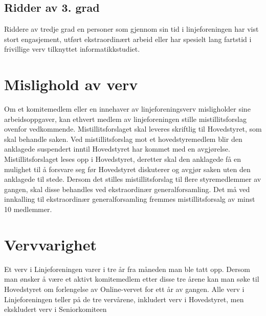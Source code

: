 \subsection{Ridder av 3. grad}

Riddere av tredje grad en personer som gjennom sin tid i linjeforeningen har vist stort engasjement, utført ekstraordinært arbeid eller har spesielt lang fartstid i frivillige verv tilknyttet informatikkstudiet.


\section{Mislighold av verv}
Om et komitemedlem eller en innehaver av linjeforeningsverv misligholder sine arbeidsoppgaver, kan ethvert medlem av linjeforeningen stille mistillitsforslag ovenfor vedkommende. Mistillitsforslaget skal leveres skriftlig til Hovedstyret, som skal behandle saken. Ved mistillitsforslag mot et hovedstyremedlem blir den anklagede suspendert inntil Hovedstyret har kommet med en avgjørelse. Mistillitsforslaget leses opp i Hovedstyret, deretter skal den anklagede få en mulighet til å forsvare seg før Hovedstyret diskuterer og avgjør saken uten den anklagede til stede. Dersom det stilles mistillitsforslag til flere styremedlemmer av gangen, skal disse behandles ved ekstraordinær generalforsamling. Det må ved innkalling til ekstraordinær generalforsamling fremmes mistillitsforsalg av minst 10 medlemmer.


\section{Vervvarighet}
Et verv i Linjeforeningen varer i tre år fra måneden man ble tatt opp. Dersom man ønsker å være et aktivt komitemedlem etter disse tre årene kan man søke til Hovedstyret om forlengelse av Online-vervet for ett år av gangen. Alle verv i Linjeforeningen teller på de tre vervårene, inkludert verv i Hovedstyret, men ekskludert verv i Seniorkomiteen

\newpage

